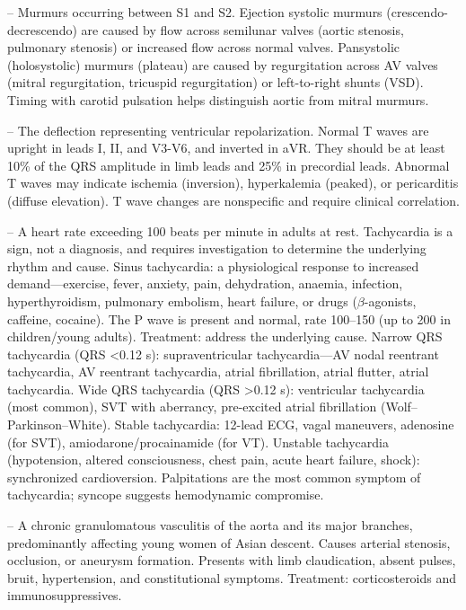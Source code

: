 -- Murmurs occurring between S1 and S2. Ejection systolic murmurs (crescendo-decrescendo) are caused by flow across semilunar valves (aortic stenosis, pulmonary stenosis) or increased flow across normal valves. Pansystolic (holosystolic) murmurs (plateau) are caused by regurgitation across AV valves (mitral regurgitation, tricuspid regurgitation) or left-to-right shunts (VSD). Timing with carotid pulsation helps distinguish aortic from mitral murmurs.

-- The deflection representing ventricular repolarization. Normal T waves are upright in leads I, II, and V3-V6, and inverted in aVR. They should be at least 10\% of the QRS amplitude in limb leads and 25\% in precordial leads. Abnormal T waves may indicate ischemia (inversion), hyperkalemia (peaked), or pericarditis (diffuse elevation). T wave changes are nonspecific and require clinical correlation.

-- A heart rate exceeding 100 beats per minute in adults at rest. Tachycardia is a sign, not a diagnosis, and requires investigation to determine the underlying rhythm and cause. Sinus tachycardia: a physiological response to increased demand—exercise, fever, anxiety, pain, dehydration, anaemia, infection, hyperthyroidism, pulmonary embolism, heart failure, or drugs ($\beta$-agonists, caffeine, cocaine). The P wave is present and normal, rate 100--150 (up to 200 in children/young adults). Treatment: address the underlying cause. Narrow QRS tachycardia (QRS <0.12 s): supraventricular tachycardia—AV nodal reentrant tachycardia, AV reentrant tachycardia, atrial fibrillation, atrial flutter, atrial tachycardia. Wide QRS tachycardia (QRS >0.12 s): ventricular tachycardia (most common), SVT with aberrancy, pre-excited atrial fibrillation (Wolf–Parkinson–White). Stable tachycardia: 12-lead ECG, vagal maneuvers, adenosine (for SVT), amiodarone/procainamide (for VT). Unstable tachycardia (hypotension, altered consciousness, chest pain, acute heart failure, shock): synchronized cardioversion. Palpitations are the most common symptom of tachycardia; syncope suggests hemodynamic compromise.

-- A chronic granulomatous vasculitis of the aorta and its major branches, predominantly affecting young women of Asian descent. Causes arterial stenosis, occlusion, or aneurysm formation. Presents with limb claudication, absent pulses, bruit, hypertension, and constitutional symptoms. Treatment: corticosteroids and immunosuppressives.

